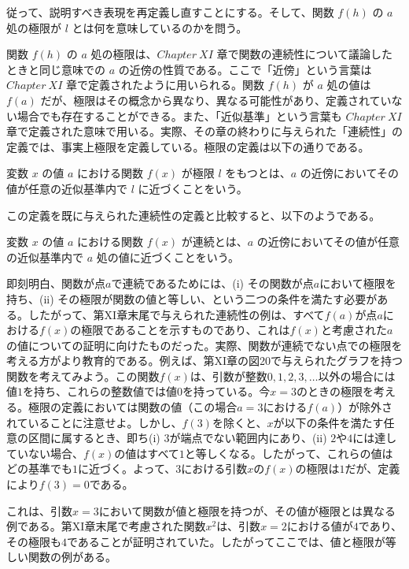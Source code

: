 \documentclass[a4paper,11pt,openany]{ltjsbook}
\providecommand{\ChapRef}[2][Chapter]{\hyperref[chapter:#2]{\Chg{#1}{Chapter}~#2}}
\providecommand{\Chg}[2]{#2}
\begin{document}
従って、説明すべき表現を再定義し直すことにする。そして、関数 $f(h)$ の $a$ 処の極限が $l$ とは何を意味しているのかを問う。

関数 $f(h)$ の $a$ 処の極限は、$\ChapRef{XI}$ 章で関数の連続性について議論したときと同じ意味での $a$ の近傍の性質である。ここで「近傍」という言葉は $\ChapRef{XI}$ 章で定義されたように用いられる。関数 $f(h)$ が $a$ 処の値は $f(a)$ だが、極限はその概念から異なり、異なる可能性があり、定義されていない場合でも存在することができる。また、「近似基準」という言葉も $\ChapRef{XI}$ 章で定義された意味で用いる。実際、その章の終わりに与えられた「連続性」の定義では、事実上極限を定義している。極限の定義は以下の通りである。

変数 $x$ の値 $a$ における関数 $f(x)$ が極限 $l$ をもつとは、$a$ の近傍においてその値が任意の近似基準内で $l$ に近づくことをいう。

この定義を既に与えられた連続性の定義と比較すると、以下のようである。

変数 $x$ の値 $a$ における関数 $f(x)$ が連続とは、$a$ の近傍においてその値が任意の近似基準内で $a$ 処の値に近づくことをいう。

即刻明白、関数が点$a$で連続であるためには、(i) その関数が点$a$において極限を持ち、(ii) その極限が関数の値と等しい、という二つの条件を満たす必要がある。したがって、第XI章末尾で与えられた連続性の例は、すべて$f(a)$が点$a$における$f(x)$の極限であることを示すものであり、これは$f(x)$と考慮された$a$の値についての証明に向けたものだった。実際、関数が連続でない点での極限を考える方がより教育的である。例えば、第XI章の図20で与えられたグラフを持つ関数を考えてみよう。この関数$f(x)$は、引数が整数$0, 1, 2, 3,\ldots$以外の場合には値$1$を持ち、これらの整数値では値$0$を持っている。今$x = 3$のときの極限を考える。極限の定義においては関数の値（この場合$a=3$における$f(a)$）が除外されていることに注意せよ。しかし、$f(3)$を除くと、$x$が以下の条件を満たす任意の区間に属するとき、即ち(i) $3$が端点でない範囲内にあり、(ii) $2$や$4$には達していない場合、$f(x)$の値はすべて$1$と等しくなる。したがって、これらの値はどの基準でも$1$に近づく。よって、$3$における引数$x$の$f(x)$の極限は$1$だが、定義により$f(3) = 0$である。

これは、引数$x=3$において関数が値と極限を持つが、その値が極限とは異なる例である。第XI章末尾で考慮された関数$x^2$は、引数$x=2$における値が$4$であり、その極限も$4$であることが証明されていた。したがってここでは、値と極限が等しい関数の例がある。
\end{document}
